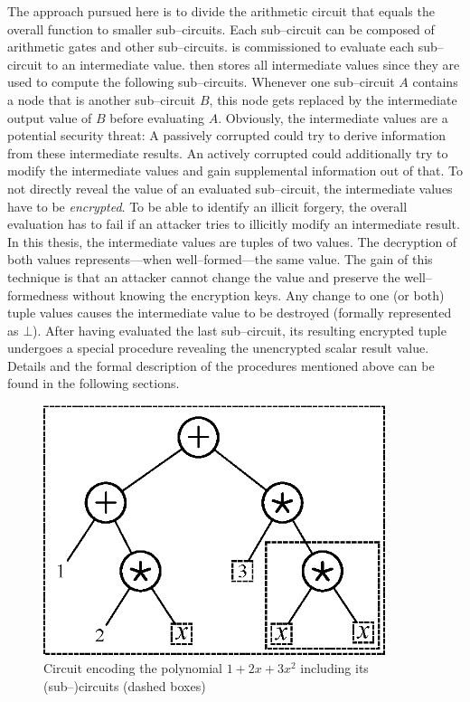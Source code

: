 The approach pursued here is to divide the arithmetic circuit that equals the
overall function to smaller sub--circuits. Each sub--circuit can be composed of
arithmetic gates and other sub--circuits. \JWpTwo{} is commissioned to evaluate
each sub--circuit to an intermediate value. \JWpTwo{} then stores all
intermediate values since they are used to compute the following sub--circuits.
Whenever one sub--circuit $A$ contains a node that is another sub--circuit $B$,
this node gets replaced by the intermediate output value of $B$ before
evaluating $A$.  Obviously, the intermediate values are a potential security
threat: A passively corrupted \JWpTwo{} could try to derive information from
these intermediate results. An actively corrupted \JWpTwo{} could additionally
try to modify the intermediate values and gain supplemental information out of
that. To not directly reveal the value of an evaluated sub--circuit, the
intermediate values have to be \emph{encrypted}. To be able to identify an
illicit forgery, the overall evaluation has to fail if an attacker tries to
illicitly modify an intermediate result. In this thesis, the intermediate values
are tuples of two values. The decryption of both values represents---when
well--formed---the same value. The gain of this technique is that an attacker
cannot change the value and preserve the well--formedness without knowing the
encryption keys. Any change to one (or both) tuple values causes the
intermediate value to be destroyed (formally represented as $\bot$). After
having evaluated the last sub--circuit, its resulting encrypted tuple undergoes
a special procedure revealing the unencrypted scalar result value. Details and
the formal description of the procedures mentioned above can be found in the
following sections.

\begin{figure}[htb]
  \centering
  \includegraphics[width=10cm]{images/sample-polynomial.eps}
  \caption{Circuit encoding the polynomial $1 + 2x + 3x^2$ including its
    (sub--)circuits (dashed boxes)}
  \label{fig:sample-poly}
\end{figure}

